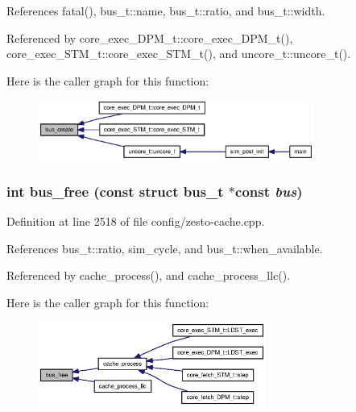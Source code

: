 References fatal(), bus\_\-t::name, bus\_\-t::ratio, and bus\_\-t::width.

Referenced by core\_\-exec\_\-DPM\_\-t::core\_\-exec\_\-DPM\_\-t(), core\_\-exec\_\-STM\_\-t::core\_\-exec\_\-STM\_\-t(), and uncore\_\-t::uncore\_\-t().

Here is the caller graph for this function:\nopagebreak
\begin{figure}[H]
\begin{center}
\leavevmode
\includegraphics[width=256pt]{zesto-cache_8h_cf58fdfdf1939cc2b0b05b50ac0eedd8_icgraph}
\end{center}
\end{figure}
\subsubsection[{bus\_\-free}]{\setlength{\rightskip}{0pt plus 5cm}int bus\_\-free (const struct {\bf bus\_\-t} $\ast$const  {\em bus})}\label{zesto-cache_8h_24292dcf41327971f03a4c7150cbdf28}




Definition at line 2518 of file config/zesto-cache.cpp.

References bus\_\-t::ratio, sim\_\-cycle, and bus\_\-t::when\_\-available.

Referenced by cache\_\-process(), and cache\_\-process\_\-llc().

Here is the caller graph for this function:\nopagebreak
\begin{figure}[H]
\begin{center}
\leavevmode
\includegraphics[width=211pt]{zesto-cache_8h_24292dcf41327971f03a4c7150cbdf28_icgraph}
\end{center}
\end{figure}
